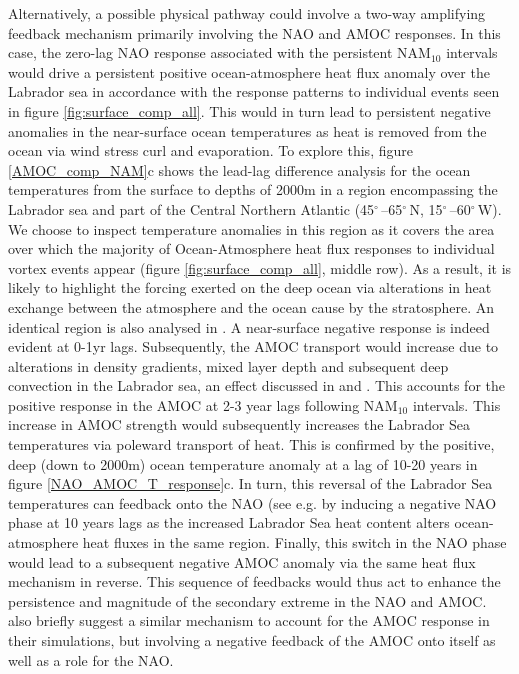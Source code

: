 Alternatively, a possible physical pathway could involve a two-way amplifying feedback mechanism primarily involving  the NAO and AMOC responses. In this case, the zero-lag NAO response associated with the persistent NAM$_{10}$ intervals would drive a persistent positive ocean-atmosphere heat flux anomaly over the Labrador sea in accordance with the response patterns to individual events seen in figure \ref{fig:surface_comp_all}. This would in turn lead to persistent negative anomalies in the near-surface ocean temperatures as heat is  removed from the ocean via wind stress curl and evaporation. To explore this, figure \ref{AMOC_comp_NAM}c shows the lead-lag difference analysis for the ocean temperatures from the surface to depths of 2000m in a region encompassing the Labrador sea and part of the Central Northern Atlantic (45$^{\circ}$\,–65$^{\circ}$\,N, 15$^{\circ}$\,–60$^{\circ}$\,W). We choose to inspect temperature anomalies in this region as it covers the area over which the majority of Ocean-Atmosphere heat flux responses to individual vortex events appear (figure \ref{fig:surface_comp_all}, middle row). As a result, it is likely to highlight the forcing exerted on the deep ocean via alterations in heat exchange between the atmosphere and the ocean cause by the stratosphere. An identical region is also analysed in \cite{reichlerStratospheric2012}. A near-surface negative response is indeed evident at 0-1yr lags. Subsequently, the AMOC transport would increase due to alterations in density gradients, mixed layer depth and subsequent deep convection in the Labrador sea, an effect discussed in \cite{delworthInterdecadal1993} and \cite{medhaugMechanisms2012}. This accounts for the positive response in the AMOC at 2-3 year lags following NAM$_{10}$ intervals. This increase in AMOC strength would subsequently increases the Labrador Sea temperatures via poleward transport of heat. This is confirmed by the positive, deep (down to 2000m) ocean temperature anomaly at a lag of 10-20 years in figure \ref{NAO_AMOC_T_response}c. In turn, this reversal of the Labrador Sea temperatures can feedback onto the NAO (see e.g. \cite{frankignoulInfluence2013} by inducing a negative NAO phase at 10 years lags as the increased Labrador Sea heat content alters ocean-atmosphere heat fluxes in the same region.  Finally, this switch in the NAO phase would lead to a subsequent negative AMOC anomaly via the same heat flux mechanism in reverse. This sequence of feedbacks would thus act to enhance the persistence and magnitude of the secondary extreme in the NAO and AMOC. \cite{reichlerStratospheric2012} also briefly suggest a similar mechanism to account for the AMOC response in their simulations, but involving a negative feedback of the AMOC onto itself as well as a role for the NAO. 


